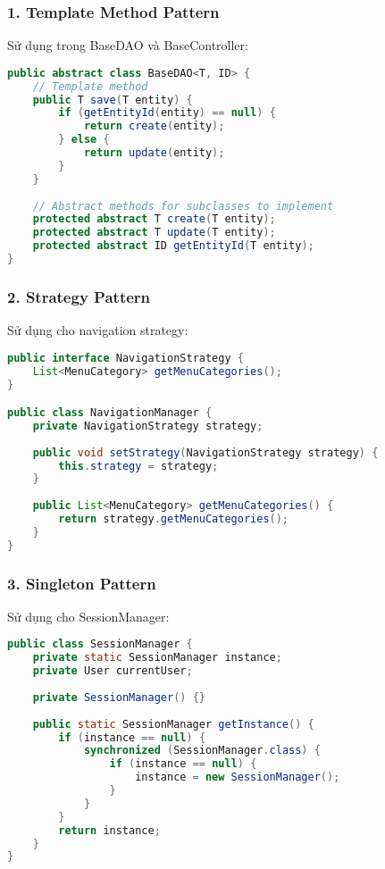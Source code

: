 \documentclass[12pt,a4paper]{article}
\begin{document}
\subsubsection{1. Template Method Pattern}

Sử dụng trong BaseDAO và BaseController:

\begin{lstlisting}[language=Java, caption=Template Method Pattern trong BaseDAO]
public abstract class BaseDAO<T, ID> {
    // Template method
    public T save(T entity) {
        if (getEntityId(entity) == null) {
            return create(entity);
        } else {
            return update(entity);
        }
    }
    
    // Abstract methods for subclasses to implement
    protected abstract T create(T entity);
    protected abstract T update(T entity);
    protected abstract ID getEntityId(T entity);
}
\end{lstlisting}

\subsubsection{2. Strategy Pattern}

Sử dụng cho navigation strategy:

\begin{lstlisting}[language=Java, caption=Strategy Pattern cho Navigation]
public interface NavigationStrategy {
    List<MenuCategory> getMenuCategories();
}

public class NavigationManager {
    private NavigationStrategy strategy;
    
    public void setStrategy(NavigationStrategy strategy) {
        this.strategy = strategy;
    }
    
    public List<MenuCategory> getMenuCategories() {
        return strategy.getMenuCategories();
    }
}
\end{lstlisting}

\subsubsection{3. Singleton Pattern}

Sử dụng cho SessionManager:

\begin{lstlisting}[language=Java, caption=Singleton Pattern trong SessionManager]
public class SessionManager {
    private static SessionManager instance;
    private User currentUser;
    
    private SessionManager() {}
    
    public static SessionManager getInstance() {
        if (instance == null) {
            synchronized (SessionManager.class) {
                if (instance == null) {
                    instance = new SessionManager();
                }
            }
        }
        return instance;
    }
}
\end{lstlisting}
\end{document}
